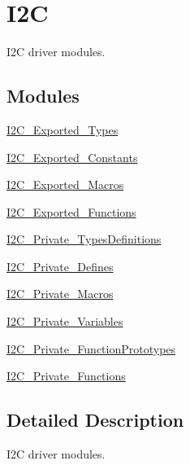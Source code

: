 \hypertarget{group___i2_c}{}\section{I2C}
\label{group___i2_c}


I2C driver modules.  


\subsection*{Modules}
\begin{DoxyCompactItemize}
\item 
\mbox{\hyperlink{group___i2_c___exported___types}{I2\+C\+\_\+\+Exported\+\_\+\+Types}}
\item 
\mbox{\hyperlink{group___i2_c___exported___constants}{I2\+C\+\_\+\+Exported\+\_\+\+Constants}}
\item 
\mbox{\hyperlink{group___i2_c___exported___macros}{I2\+C\+\_\+\+Exported\+\_\+\+Macros}}
\item 
\mbox{\hyperlink{group___i2_c___exported___functions}{I2\+C\+\_\+\+Exported\+\_\+\+Functions}}
\item 
\mbox{\hyperlink{group___i2_c___private___types_definitions}{I2\+C\+\_\+\+Private\+\_\+\+Types\+Definitions}}
\item 
\mbox{\hyperlink{group___i2_c___private___defines}{I2\+C\+\_\+\+Private\+\_\+\+Defines}}
\item 
\mbox{\hyperlink{group___i2_c___private___macros}{I2\+C\+\_\+\+Private\+\_\+\+Macros}}
\item 
\mbox{\hyperlink{group___i2_c___private___variables}{I2\+C\+\_\+\+Private\+\_\+\+Variables}}
\item 
\mbox{\hyperlink{group___i2_c___private___function_prototypes}{I2\+C\+\_\+\+Private\+\_\+\+Function\+Prototypes}}
\item 
\mbox{\hyperlink{group___i2_c___private___functions}{I2\+C\+\_\+\+Private\+\_\+\+Functions}}
\end{DoxyCompactItemize}


\subsection{Detailed Description}
I2C driver modules. 

